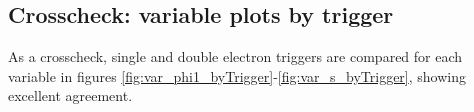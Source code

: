 \subsection{Crosscheck: variable plots by trigger}

As a crosscheck, single and double electron triggers are compared for each variable in figures \ref{fig:var_phi1_byTrigger}-\ref{fig:var_s_byTrigger}, showing excellent agreement.



